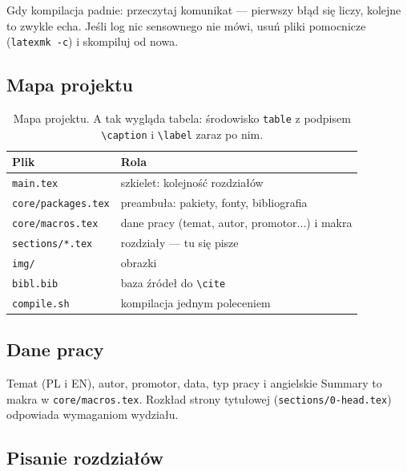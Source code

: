 Gdy kompilacja padnie: przeczytaj komunikat — pierwszy błąd się liczy,
kolejne to zwykle echa. Jeśli log nic sensownego nie mówi, usuń pliki
pomocnicze (\verb|latexmk -c|) i skompiluj od nowa.

\subsection*{Mapa projektu}

\begin{table}[H]
	\centering
	\caption{Mapa projektu. A tak wygląda tabela: środowisko
		\texttt{table} z podpisem \texttt{\textbackslash caption}
		i \texttt{\textbackslash label} zaraz po nim.}
	\label{tab:mapa-projektu}
	\begin{tabular}{|l|p{8.5cm}|}
		\hline
		\textbf{Plik}              & \textbf{Rola}                                  \\
		\hline
		\texttt{main.tex}          & szkielet: kolejność rozdziałów                 \\
		\texttt{core/packages.tex} & preambuła: pakiety, fonty, bibliografia        \\
		\texttt{core/macros.tex}   & dane pracy (temat, autor, promotor...) i makra \\
		\texttt{sections/*.tex}    & rozdziały — tu się pisze                       \\
		\texttt{img/}              & obrazki                                        \\
		\texttt{bibl.bib}          & baza źródeł do \texttt{\textbackslash cite}    \\
		\texttt{compile.sh}        & kompilacja jednym poleceniem                   \\
		\hline
	\end{tabular}
\end{table}

\subsection*{Dane pracy}

Temat (PL i EN), autor, promotor, data, typ pracy i angielskie Summary
to makra w \verb|core/macros.tex|. Rozkład strony tytułowej
(\verb|sections/0-head.tex|) odpowiada wymaganiom wydziału.

\subsection*{Pisanie rozdziałów}

